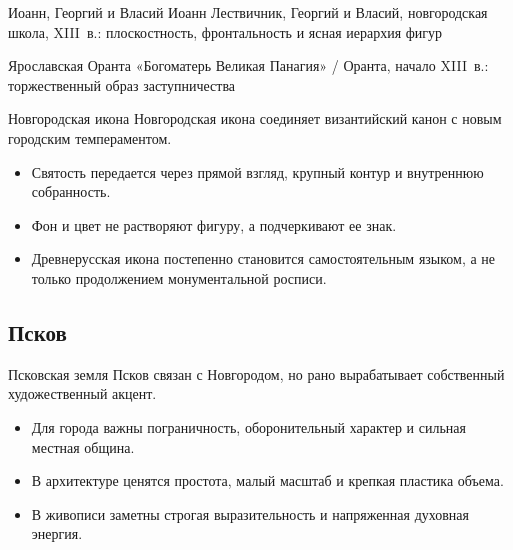 \begin{frame}{Иоанн, Георгий и Власий}
    {Иоанн Лествичник, Георгий и Власий,
     новгородская школа, XIII~в.:
     плоскостность, фронтальность и ясная иерархия фигур}
\end{frame}

\begin{frame}{Ярославская Оранта}
    {«Богоматерь Великая Панагия» / Оранта,
     начало XIII~в.: торжественный образ заступничества}
\end{frame}

\begin{frame}{Новгородская икона}
  Новгородская икона соединяет византийский канон
  с новым городским темпераментом.

  \begin{itemize}
    \item Святость передается через прямой взгляд,
          крупный контур и внутреннюю собранность.
    \item Фон и цвет не растворяют фигуру, а подчеркивают ее знак.
    \item Древнерусская икона постепенно становится самостоятельным
          языком, а не только продолжением монументальной росписи.
  \end{itemize}
\end{frame}

\subsection{Псков}

\begin{frame}{Псковская земля}
  Псков связан с Новгородом, но рано вырабатывает собственный
  художественный акцент.

  \begin{itemize}
    \item Для города важны пограничность, оборонительный характер
          и сильная местная община.
    \item В архитектуре ценятся простота, малый масштаб
          и крепкая пластика объема.
    \item В живописи заметны строгая выразительность
          и напряженная духовная энергия.
  \end{itemize}
\end{frame}

